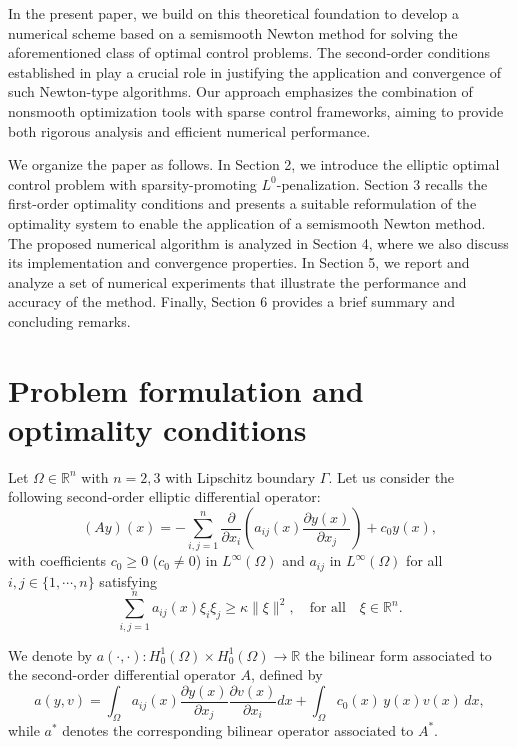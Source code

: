 \documentclass[11pt,a4paper]{amsart}
\renewcommand{\l}{\left}
\renewcommand{\r}{\right}
\newcommand{\om}{\Omega}
\newcommand{\reals}{\mathbb{R}}
\newcommand{\norm}[1]{\lVert #1 \rVert}
\begin{document}
In the present paper, we build on this theoretical foundation to develop a numerical scheme based on a semismooth Newton method for solving the aforementioned class of optimal control problems. The second-order conditions established in \cite{casaswachsmuth} play a crucial role in justifying the application and convergence of such Newton-type algorithms. Our approach emphasizes the combination of nonsmooth optimization tools with sparse control frameworks, aiming to provide both rigorous analysis and efficient numerical performance.

We organize the paper as follows. In Section 2, we introduce the elliptic optimal control problem with sparsity-promoting $L^0$-penalization. Section 3 recalls the first-order optimality conditions and presents a suitable reformulation of the optimality system to enable the application of a semismooth Newton method. The proposed numerical algorithm is analyzed in Section 4, where we also discuss its implementation and convergence properties. In Section 5, we report and analyze a set of numerical experiments that illustrate the performance and accuracy of the method. Finally, Section 6 provides a brief summary and concluding remarks.
\section{Problem formulation and optimality conditions}

Let $\om \in \reals^{n}$ with $n=2, 3$ with Lipschitz boundary $\Gamma$. Let us consider the following second-order elliptic differential operator:
\[
    (Ay)(x) = - \sum_{i,j=1}^n \frac{\partial}{\partial x_i}	\l( a_{ij}(x)\frac{\partial y(x)} {\partial x_j }\r) +c_0 y(x),
\]
with coefficients  $c_0 \geq 0$  ($c_0 \not =0$) in  $L^\infty(\om)$ and  $a_{ij}$  in $L^\infty(\om)$ for all $i,j\in \{1,\cdots,n\}$ satisfying
\begin{equation}\label{pdecondition}
    \sum_{i,j=1}^{n}a_{ij}(x)\xi_{i}\xi_{j} \ge \kappa\norm{\xi}^2, \quad \text{for all} \quad \xi\in \reals^n.
\end{equation}

We denote by $a(\cdot, \cdot):H_0^1(\om) \times H_0^1(\om)\to \reals$  the bilinear form associated to the second-order differential operator $A$, defined by $$a(y,v)=\int_\om a_{ij}(x)\frac{\partial y(x)}{\partial x_j} \frac{\partial v(x)}{\partial x_i} dx + \int_\om c_0(x)\,y(x)v(x)\,dx, $$
while $a^*$ denotes the corresponding bilinear operator associated to $A^*$.
	
\end{document}
